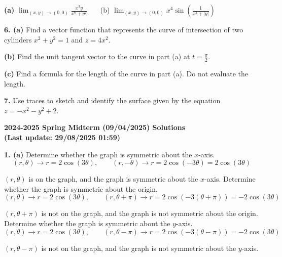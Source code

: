 \documentclass{article}
\begin{document}
\textbf{(a)} $\displaystyle\lim_{(x,y)\to(0,0)}\frac{x^3y}{x^6+y^2}$ \ \ \ (b) $\displaystyle\lim_{(x,y)\to(0,0)}x^4\sin\left(\frac1{x^2+\left|y\right|}\right)$ \ \ \ 

\vspace{1em}

\textbf{6. (a)} Find a vector function that represents the curve of intersection of two cylinders $x^2+y^2=1$ and $z=4x^2$.

\textbf{(b)} Find the unit tangent vector to the curve in part (a) at $\displaystyle t=\frac\pi2$.

\textbf{(c)} Find a formula for the length of the curve in part (a). Do not evaluate the length.

\vspace{1em}

\textbf{7.} Use traces to sketch and identify the surface given by the equation $z=-x^2-y^2+2$.

\newpage

\begin{center}
\textbf{2024-2025 Spring Midterm (09/04/2025) Solutions\\
(Last update: 29/08/2025 01:59)}
\end{center}

\textbf{1. (a)} Determine whether the graph is symmetric about the $x$-axis.
\[(r,\theta)\rightarrow r=2\cos(3\theta),\qquad (r,-\theta)\rightarrow r=2\cos(-3\theta)=2\cos(3\theta)\]

$(r,\theta)$ is on the graph, and the graph is symmetric about the $x$-axis. Determine whether the graph is symmetric about the origin.
\[(r,\theta)\rightarrow r=2\cos(3\theta),\qquad (r,\theta+\pi)\rightarrow r=2\cos(-3(\theta+\pi))=-2\cos(3\theta)\]

$(r,\theta+\pi)$ is not on the graph, and the graph is not symmetric about the origin. Determine whether the graph is symmetric about the $y$-axis.
\[(r,\theta)\rightarrow r=2\cos(3\theta),\qquad (r,\theta-\pi)\rightarrow r=2\cos(-3(\theta-\pi))=-2\cos(3\theta)\]

$(r,\theta-\pi)$ is not on the graph, and the graph is not symmetric about the $y$-axis. 

\begin{center}
\end{center}
\end{document}

